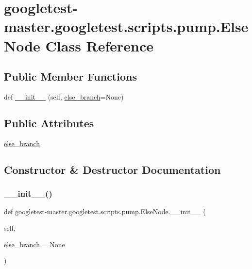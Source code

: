 \hypertarget{classgoogletest-master_1_1googletest_1_1scripts_1_1pump_1_1_else_node}{}\section{googletest-\/master.googletest.\+scripts.\+pump.\+Else\+Node Class Reference}
\label{classgoogletest-master_1_1googletest_1_1scripts_1_1pump_1_1_else_node}
\subsection*{Public Member Functions}
\begin{DoxyCompactItemize}
\item 
def \mbox{\hyperlink{classgoogletest-master_1_1googletest_1_1scripts_1_1pump_1_1_else_node_a11db76b0394e96d267bb6ed0e1c9f32f}{\+\_\+\+\_\+init\+\_\+\+\_\+}} (self, \mbox{\hyperlink{classgoogletest-master_1_1googletest_1_1scripts_1_1pump_1_1_else_node_a35b835947b95873f65ed6092718c0b43}{else\+\_\+branch}}=None)
\end{DoxyCompactItemize}
\subsection*{Public Attributes}
\begin{DoxyCompactItemize}
\item 
\mbox{\hyperlink{classgoogletest-master_1_1googletest_1_1scripts_1_1pump_1_1_else_node_a35b835947b95873f65ed6092718c0b43}{else\+\_\+branch}}
\end{DoxyCompactItemize}


\subsection{Constructor \& Destructor Documentation}
\mbox{\label{classgoogletest-master_1_1googletest_1_1scripts_1_1pump_1_1_else_node_a11db76b0394e96d267bb6ed0e1c9f32f}} 
\subsubsection{\texorpdfstring{\_\_init\_\_()}{\_\_init\_\_()}}
{\footnotesize\ttfamily def googletest-\/master.\+googletest.\+scripts.\+pump.\+Else\+Node.\+\_\+\+\_\+init\+\_\+\+\_\+ (\begin{DoxyParamCaption}\item[{}]{self,  }\item[{}]{else\+\_\+branch = {\ttfamily None} }\end{DoxyParamCaption})}




